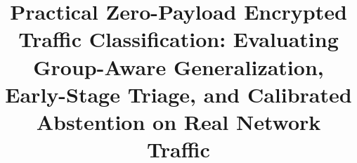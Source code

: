 \documentclass[conference]{IEEEtran}
\begin{document}
\title{Practical Zero-Payload Encrypted Traffic Classification: Evaluating Group-Aware Generalization, Early-Stage Triage, and Calibrated Abstention on Real Network Traffic}

\author{
}

\maketitle

\begin{abstract}

\end{abstract}
\end{document}

